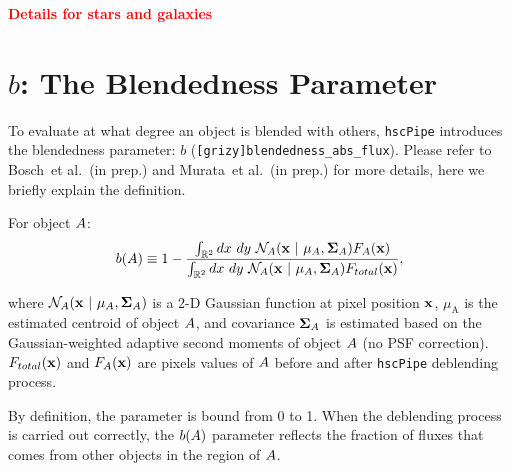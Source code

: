 \documentclass[useamsfonts]{pasj01}
\def\etal{{\ et al.~}}
\def\hscpipe{\texttt{hscPipe}}
\newcommand{\todo}[1]{\textcolor{red} {\textbf{#1}}}
\begin{document}
    \todo{Details for stars and galaxies}
    

\section{$b$: The Blendedness Parameter}
    \label{app:defineb}
        
    To evaluate at what degree an object is blended with others, \hscpipe{} introduces
    the blendedness parameter: $b$ (\texttt{[grizy]blendedness\_abs\_flux}). 
    Please refer to Bosch\etal (in prep.) and Murata\etal (in prep.) for more details, 
    here we briefly explain the definition. 
    
    For object ${\rm A}$: 
    \begin{eqnarray*}
        b({\rm A}) \equiv
        1-\frac{\int_{\mathbb{R}^2} {\rm d}x~ {\rm d}y\ \mathcal{N}_{\mathrm{A}}({\bf x}\ |\  \mu_{\mathrm{A}}, {\bf\Sigma}_{\mathrm{A}}) 
        F_{\mathrm{A}}({\bf x})}{\int_{\mathbb{R}^2} {\rm d}x~ {\rm d}y\ \mathcal{N}_{\mathrm{A}}({\bf x}\ |\  \mu_{\mathrm{A}},
        {\bf\Sigma}_{\rm{A}}) F_{\rm{total}}({\bf x})},      
        \label{eq:defineb}
    \end{eqnarray*}
    
    \noindent 
    where $\mathcal{N}_{\rm{A}}({ \bf x }\ |\  \mu_{\rm{A}}, {\bf\Sigma}_{\rm{A}})$ 
    is a 2-D Gaussian function at pixel position $\bf x$, $\mu_{\mathrm{A}}$ is the 
    estimated centroid of object ${\rm A}$, and covariance ${\bf \Sigma}_{\mathrm{A}}$ 
    is estimated based on the Gaussian-weighted adaptive second moments of object 
    ${\rm A}$ (no PSF correction). 
    $F_{\mathrm{total}}({\bf x })$ and $F_{\rm{A}}({\bf x })$ are pixels values of 
    ${\rm A}$ before and after \hscpipe{} deblending process. 
    
    By definition, the parameter is bound from 0 to 1. 
    When the deblending process is carried out correctly, the $b({\rm A})$ parameter 
    reflects the fraction of fluxes that comes from other objects in the 
    region of ${\rm A}$.

%

\label{lastpage}
\end{document}
